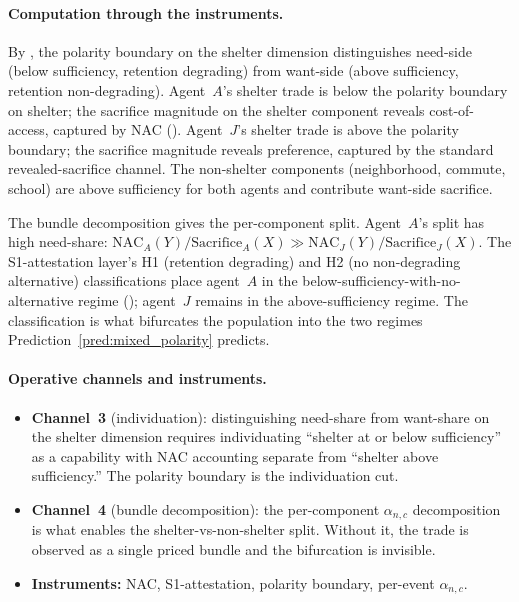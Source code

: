 \paragraph{Computation through the instruments.}
By
\citep[Definition~3]{lasser2026paper8b}, the polarity
boundary on the shelter dimension distinguishes need-side
(below sufficiency, retention degrading) from want-side
(above sufficiency, retention non-degrading).  Agent~$A$'s
shelter trade is below the polarity boundary on shelter; the
sacrifice magnitude on the shelter component reveals
cost-of-access, captured by NAC
(\citep[Definition~9]{lasser2026paper8b}).  Agent~$J$'s
shelter trade is above the polarity boundary; the sacrifice
magnitude reveals preference, captured by the standard
revealed-sacrifice channel.  The non-shelter components
(neighborhood, commute, school) are above sufficiency for
both agents and contribute want-side sacrifice.

The bundle decomposition gives the per-component split.
Agent~$A$'s split has high need-share:
$\mathrm{NAC}_A(Y) / \mathrm{Sacrifice}_A(X) \gg
\mathrm{NAC}_J(Y) / \mathrm{Sacrifice}_J(X)$.  The
S1-attestation layer's H1 (retention degrading) and H2 (no
non-degrading alternative) classifications place agent~$A$
in the below-sufficiency-with-no-alternative regime
(\citep[Definition~6]{lasser2026paper8b});
agent~$J$ remains in the above-sufficiency regime.  The
classification is what bifurcates the population into the
two regimes Prediction~\ref{pred:mixed_polarity} predicts.

\paragraph{Operative channels and instruments.}
\begin{itemize}
\item \textbf{Channel~3} (individuation): distinguishing
  need-share from want-share on the shelter dimension
  requires individuating ``shelter at or below sufficiency''
  as a capability with NAC accounting separate from
  ``shelter above sufficiency.''  The polarity boundary is
  the individuation cut.
\item \textbf{Channel~4} (bundle decomposition): the per-component
  $\alpha_{n,c}$ decomposition is what enables the
  shelter-vs-non-shelter split.  Without it, the trade is
  observed as a single priced bundle and the bifurcation is
  invisible.
\item \textbf{Instruments:} NAC, S1-attestation, polarity
  boundary, per-event $\alpha_{n,c}$.
\end{itemize}

